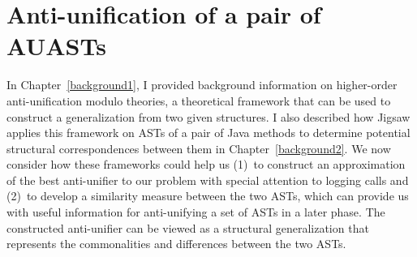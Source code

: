 \chapter{Anti-unification of a pair of AUASTs} \label{ch4} \label{methodology}





In Chapter~\ref{background1}, I provided background information on higher-order anti-unification modulo theories, a theoretical framework that can be used to construct a generalization from two given structures. I also described how Jigsaw applies this framework on ASTs of a pair of Java methods to determine potential structural correspondences between them in Chapter~\ref{background2}. We now consider how these frameworks could help us (1)~to construct an approximation of the best anti-unifier to our problem with special attention to logging calls  and (2)~to develop a similarity measure between the two ASTs, which can provide us with useful information for anti-unifying a set of ASTs in a later phase. The constructed anti-unifier can be viewed as a structural generalization that represents the commonalities and differences between the two ASTs. 


